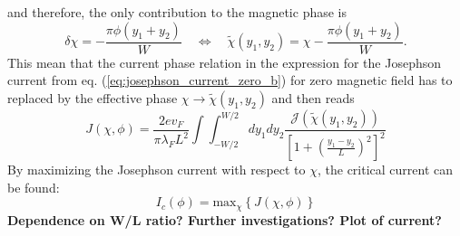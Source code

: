 and therefore, the only contribution to the magnetic phase is
\begin{equation}
\delta \chi = -\frac{\pi \phi (y_1 + y_2)}{W} \quad \Leftrightarrow \quad \tilde{\chi}(y_1, y_2) = \chi  -\frac{\pi \phi (y_1 + y_2)}{W}.
\label{eq:chi_plane}
\end{equation}
This mean that the current phase relation in the  expression for the Josephson current from eq. (\ref{eq:josephson_current_zero_b}) for zero magnetic field has to replaced by the effective phase $\chi \rightarrow \tilde{\chi}(y_1, y_2)$ and then reads
\begin{equation}
J\left(\chi, \phi \right) = \frac{2 e v_F}{\pi \lambda_F L^2}  \int \int_{-W/2}^{W/2} d y_1 d y_2 \frac{\mathcal{J}(\tilde{\chi}(y_1, y_2))}{\left[ 1 + \left(\frac{y_1 - y_2}{L}\right)^2\right]^2}
\label{eq:josephson_current}
\end{equation}
By maximizing the Josephson current with respect to $\chi$, the critical current can be found:
\begin{equation}
I_c(\phi) = \text{max}_{\chi}\left\{ J(\chi, \phi) \right\}
\end{equation}
\textbf{Dependence on W/L ratio? Further investigations? Plot of current?}

